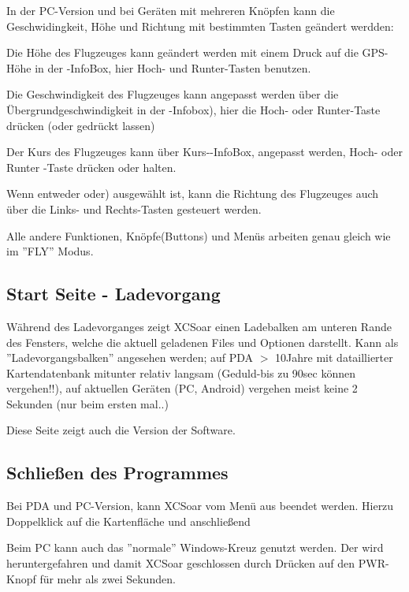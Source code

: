 In der PC-Version und bei Geräten mit mehreren Knöpfen kann die Geschwidingkeit, Höhe und Richtung mit bestimmten Tasten geändert werdden: 



Die Höhe des Flugzeuges kann geändert werden mit einem Druck auf die GPS-Höhe in der -InfoBox, hier Hoch- und Runter-Tasten benutzen. 

Die Geschwindigkeit des Flugzeuges kann angepasst werden über die Übergrundgeschwindigkeit in der -Infobox), hier die Hoch- oder Runter-Taste drücken (oder gedrückt lassen)

Der Kurs des Flugzeuges kann über Kurs--InfoBox, angepasst werden, Hoch- oder Runter -Taste drücken oder halten. 

Wenn entweder  oder) ausgewählt ist, 
kann die Richtung des Flugzeuges auch über die Links- und Rechts-Tasten gesteuert werden.

Alle andere Funktionen, Knöpfe(Buttons) und Menüs arbeiten genau gleich wie im ''FLY'' Modus. 


\subsection*{Start Seite - Ladevorgang}
Während des Ladevorganges zeigt {\textsf  XCSoar} einen Ladebalken am unteren Rande des Fensters, 
welche die aktuell geladenen Files und Optionen darstellt. Kann als ''Ladevorgangsbalken'' angesehen werden;  auf PDA $>$ 10Jahre mit dataillierter Kartendatenbank mitunter 
relativ langsam (Geduld-bis zu 90sec können vergehen!!), auf aktuellen Geräten (PC, Android) vergehen meist keine 2 Sekunden (nur beim ersten mal..) 

Diese Seite zeigt auch die Version der Software.

\subsection*{Schließen des Programmes}
Bei PDA und PC-Version, kann {\textsf  XCSoar} vom Menü aus beendet werden. Hierzu Doppelklick auf die Kartenfläche und anschließend 
\begin{quote}
\end{quote}

Beim PC kann auch das ''normale'' Windows-Kreuz genutzt werden.
Der \al wird heruntergefahren und damit {\textsf  XCSoar} geschlossen durch Drücken auf den PWR-Knopf für mehr als zwei Sekunden.
